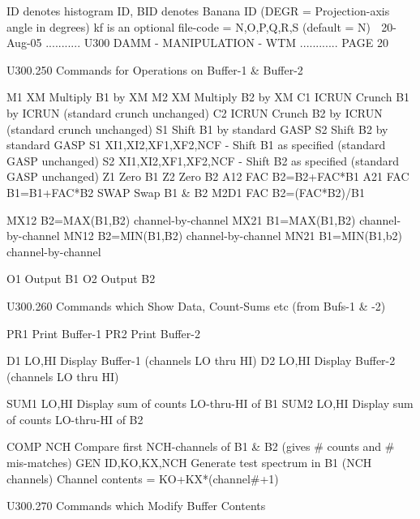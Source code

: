    ID denotes histogram ID, BID denotes Banana ID
   (DEGR = Projection-axis angle in degrees)
   kf is an optional file-code = N,O,P,Q,R,S (default = N)
    
   20-Aug-05 ........... U300  DAMM - MANIPULATION - WTM ............ PAGE  20
 
   U300.250  Commands for Operations on Buffer-1 & Buffer-2
 
   M1  XM             Multiply B1 by XM
   M2  XM             Multiply B2 by XM
   C1  ICRUN          Crunch B1  by ICRUN (standard crunch unchanged)
   C2  ICRUN          Crunch B2  by ICRUN (standard crunch unchanged)
   S1                 Shift  B1  by standard GASP
   S2                 Shift  B2  by standard GASP
   S1  XI1,XI2,XF1,XF2,NCF - Shift B1 as specified (standard GASP unchanged)
   S2  XI1,XI2,XF1,XF2,NCF - Shift B2 as specified (standard GASP unchanged)
   Z1                 Zero B1
   Z2                 Zero B2
   A12  FAC           B2=B2+FAC*B1
   A21  FAC           B1=B1+FAC*B2
   SWAP               Swap B1 & B2
   M2D1 FAC           B2=(FAC*B2)/B1
 
   MX12               B2=MAX(B1,B2) channel-by-channel
   MX21               B1=MAX(B1,B2) channel-by-channel
   MN12               B2=MIN(B1,B2) channel-by-channel
   MN21               B1=MIN(B1,b2) channel-by-channel
 
   O1                 Output B1
   O2                 Output B2
 
   U300.260  Commands which Show Data, Count-Sums etc (from Bufs-1 & -2)
 
   PR1                Print   Buffer-1
   PR2                Print   Buffer-2
 
   D1   LO,HI         Display Buffer-1 (channels LO thru HI)
   D2   LO,HI         Display Buffer-2 (channels LO thru HI)
 
   SUM1 LO,HI         Display sum of counts LO-thru-HI of B1
   SUM2 LO,HI         Display sum of counts LO-thru-HI of B2
 
   COMP NCH           Compare first NCH-channels of B1 & B2
                      (gives # counts and # mis-matches)
   GEN  ID,KO,KX,NCH  Generate test spectrum in B1 (NCH channels)
                      Channel contents = KO+KX*(channel#+1)
 
   U300.270  Commands which Modify Buffer Contents
 
